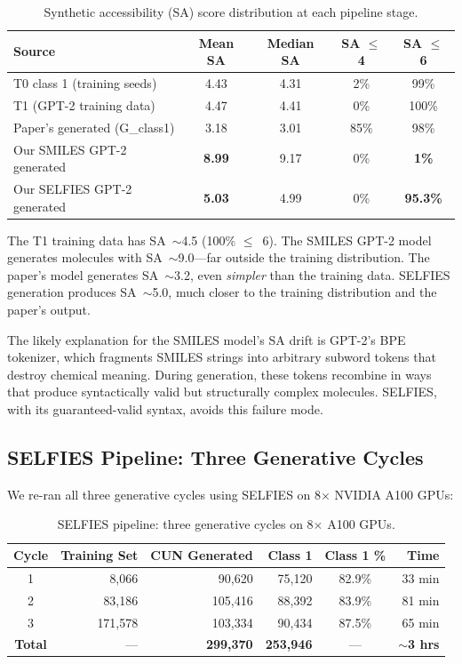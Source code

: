\documentclass[11pt,a4paper]{article}
\begin{document}
\begin{table}[H]
\centering
\caption{Synthetic accessibility (SA) score distribution at each pipeline stage.}
\label{tab:sa_diagnosis}
\begin{tabular}{lcccc}
\toprule
Source & Mean SA & Median SA & SA $\leq$ 4 & SA $\leq$ 6 \\
\midrule
T0 class 1 (training seeds) & 4.43 & 4.31 & 2\% & 99\% \\
T1 (GPT-2 training data) & 4.47 & 4.41 & 0\% & 100\% \\
\midrule
Paper's generated (G\_class1) & 3.18 & 3.01 & 85\% & 98\% \\
Our SMILES GPT-2 generated & \textbf{8.99} & 9.17 & 0\% & \textbf{1\%} \\
Our SELFIES GPT-2 generated & \textbf{5.03} & 4.99 & 0\% & \textbf{95.3\%} \\
\bottomrule
\end{tabular}
\end{table}

The T1 training data has SA~$\sim$4.5 (100\% $\leq$~6). The SMILES GPT-2 model generates molecules with SA~$\sim$9.0---far outside the training distribution. The paper's model generates SA~$\sim$3.2, even \textit{simpler} than the training data. SELFIES generation produces SA~$\sim$5.0, much closer to the training distribution and the paper's output.

The likely explanation for the SMILES model's SA drift is GPT-2's BPE tokenizer, which fragments SMILES strings into arbitrary subword tokens that destroy chemical meaning. During generation, these tokens recombine in ways that produce syntactically valid but structurally complex molecules. SELFIES, with its guaranteed-valid syntax, avoids this failure mode.

\subsection{SELFIES Pipeline: Three Generative Cycles}

We re-ran all three generative cycles using SELFIES on 8$\times$ NVIDIA A100 GPUs:

\begin{table}[H]
\centering
\caption{SELFIES pipeline: three generative cycles on 8$\times$ A100 GPUs.}
\label{tab:selfies_cycles}
\begin{tabular}{crrrcr}
\toprule
Cycle & Training Set & CUN Generated & Class 1 & Class 1 \% & Time \\
\midrule
1 & 8,066 & 90,620 & 75,120 & 82.9\% & 33 min \\
2 & 83,186 & 105,416 & 88,392 & 83.9\% & 81 min \\
3 & 171,578 & 103,334 & 90,434 & 87.5\% & 65 min \\
\midrule
\textbf{Total} & --- & \textbf{299,370} & \textbf{253,946} & --- & \textbf{$\sim$3 hrs} \\
\bottomrule
\end{tabular}
\end{table}
\end{document}
